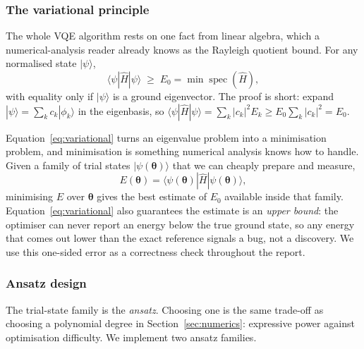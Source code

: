 \documentclass[sigconf,screen,nonacm]{acmart}
\begin{document}
\subsubsection{The variational principle}

The whole VQE algorithm rests on one fact from linear algebra, which a
numerical-analysis reader already knows as the Rayleigh quotient bound. For
any normalised state $|\psi\rangle$,
\begin{equation}
\boxed{\;\langle\psi|\hat{H}|\psi\rangle \;\geq\; E_0
= \min\operatorname{spec}(\hat{H}),\;}
\label{eq:variational}
\end{equation}
with equality only if $|\psi\rangle$ is a ground eigenvector. The proof is
short: expand $|\psi\rangle=\sum_k c_k|\phi_k\rangle$ in the eigenbasis, so
$\langle\psi|\hat{H}|\psi\rangle=\sum_k |c_k|^2 E_k \geq E_0\sum_k|c_k|^2 =
E_0$.

Equation~\eqref{eq:variational} turns an eigenvalue problem into a
minimisation problem, and minimisation is something numerical analysis knows
how to handle. Given a family of trial states
$|\psi(\boldsymbol\theta)\rangle$ that we can cheaply prepare and measure,
\begin{equation}
E(\boldsymbol\theta)
= \langle\psi(\boldsymbol\theta)|\hat{H}|\psi(\boldsymbol\theta)\rangle,
\end{equation}
minimising $E$ over $\boldsymbol\theta$ gives the best estimate of $E_0$
available inside that family. Equation~\eqref{eq:variational} also
guarantees the estimate is an \emph{upper bound}: the optimiser can never
report an energy below the true ground state, so any energy that comes out
lower than the exact reference signals a bug, not a discovery. We use this
one-sided error as a correctness check throughout the report.

\subsubsection{Ansatz design}

The trial-state family is the \emph{ansatz}. Choosing one is the same
trade-off as choosing a polynomial degree in Section~\ref{sec:numerics}:
expressive power against optimisation difficulty. We implement two ansatz
families.
\end{document}
